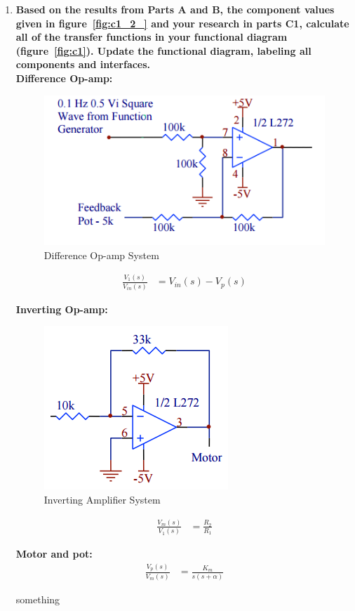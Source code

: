 \documentclass[11pt,a4paper]{article}
\begin{document}
\begin{enumerate}
    
    
    \pagebreak
	\item \textbf{Based on the results from Parts A and B, the component values given in figure~\ref{fig:c1_2_} and your research in parts C1, calculate all of the transfer functions in your functional diagram (figure~\ref{fig:c1}). Update the functional diagram, labeling all components and interfaces.}  \\
    
    \textbf{Difference Op-amp:}\\
    \begin{figure}[H]
	\centering
	\includegraphics[width=.4\textwidth]{FigsC/c2b.png}
	\caption{\label{fig:diffamp}Difference Op-amp System}
	\end{figure}
    \begin{align*}
	\frac{V_{1}(s)}{V_{in}(s)} &= V_{in}(s) - V_{p}(s)
	\end{align*}
    
    
    \textbf{Inverting Op-amp:}\\
    \begin{figure}[H]
	\centering
	\includegraphics[width=.3\textwidth]{FigsC/c2a.png}
	\caption{\label{fig:invamp}Inverting Amplifier System}
	\end{figure}
    \begin{align*}
	\frac{V_{m}(s)}{V_{1}(s)} &= \frac{R_2}{R_1}
	\end{align*}
    
    
    \textbf{Motor and pot:}\\
    \begin{align*}
	\frac{V_{p}(s)}{V_{m}(s)} &= \frac{K_m}{s(s+\alpha)}
	\end{align*}
    
    something \\
    

\end{enumerate}
\end{document}
